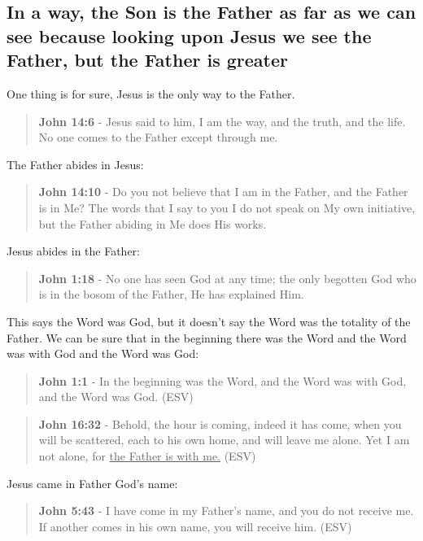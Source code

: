 \documentclass[11pt]{article}
\begin{document}
\subsection{In a way, the Son is the Father as far as we can see because looking upon Jesus we see the Father, but the Father is greater}
\label{sec:org5899f8e}

One thing is for sure, Jesus is the only way to the Father.

\begin{quote}
\textbf{John 14:6} - Jesus said to him, I am the way, and the truth, and the life. No one comes to the Father except through me.
\end{quote}

The Father abides in Jesus:

\begin{quote}
\textbf{John 14:10} - Do you not believe that I am in the Father, and the Father is in Me? The words that I say to you I do not speak on My own initiative, but the Father abiding in Me does His works.
\end{quote}

Jesus abides in the Father:

\begin{quote}
\textbf{John 1:18} - No one has seen God at any time; the only begotten God who is in the bosom of the Father, He has explained Him.
\end{quote}

This says the Word was God, but it doesn't say the Word was the totality of the Father. We can be sure that in the beginning there was the Word and the Word was with God and the Word was God:

\begin{quote}
\textbf{John 1:1} - In the beginning was the Word, and the Word was with God, and the Word was God. (ESV)
\end{quote}

\begin{quote}
\textbf{John 16:32} - Behold, the hour is coming, indeed it has come, when you will be scattered, each to his own home, and will leave me alone. Yet I am not alone, for \uline{the Father is with me.} (ESV)
\end{quote}

Jesus came in Father God's name:

\begin{quote}
\textbf{John 5:43} - I have come in my Father's name, and you do not receive me. If another comes in his own name, you will receive him. (ESV)
\end{quote}
\end{document}
